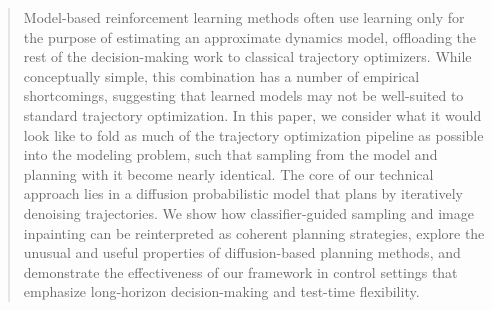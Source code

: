 \begin{abstract}
Model-based reinforcement learning methods often use learning only for the purpose of estimating an approximate dynamics model, offloading the rest of the decision-making work to classical trajectory optimizers.
While conceptually simple, this combination has a number of empirical shortcomings, suggesting that learned models may not be well-suited to standard trajectory optimization.
In this paper, we consider what it would look like to fold as much of the trajectory optimization pipeline as possible into the modeling problem, such that sampling from the model and planning with it become nearly identical.
The core of our technical approach lies in a diffusion probabilistic model that plans by iteratively denoising trajectories.
We show how classifier-guided sampling and image inpainting can be reinterpreted as coherent planning strategies, explore the unusual and useful properties of diffusion-based planning methods, and demonstrate the effectiveness of our framework in control settings that emphasize long-horizon decision-making and test-time flexibility.
\end{abstract}
